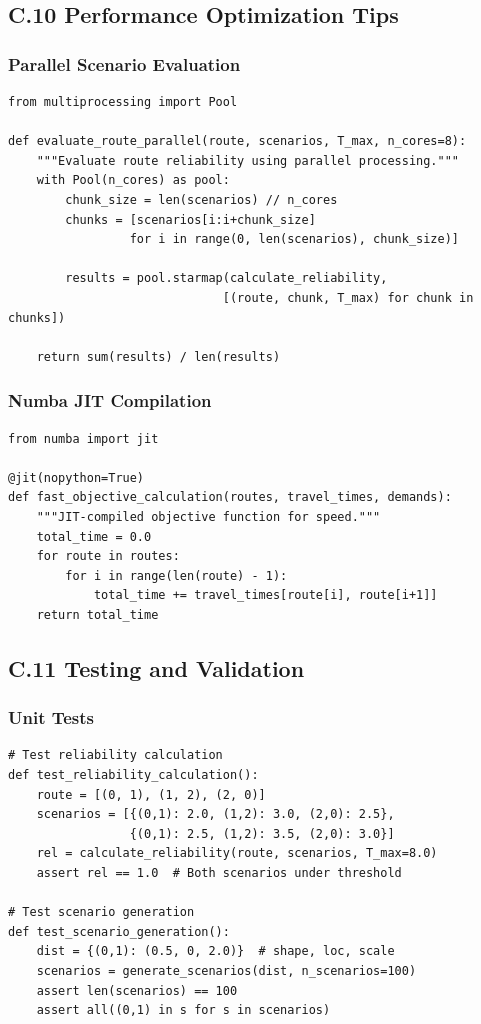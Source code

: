 \subsection{C.10 Performance Optimization Tips}

\subsubsection{Parallel Scenario Evaluation}

\begin{verbatim}
from multiprocessing import Pool

def evaluate_route_parallel(route, scenarios, T_max, n_cores=8):
    """Evaluate route reliability using parallel processing."""
    with Pool(n_cores) as pool:
        chunk_size = len(scenarios) // n_cores
        chunks = [scenarios[i:i+chunk_size]
                 for i in range(0, len(scenarios), chunk_size)]

        results = pool.starmap(calculate_reliability,
                              [(route, chunk, T_max) for chunk in chunks])

    return sum(results) / len(results)
\end{verbatim}

\subsubsection{Numba JIT Compilation}

\begin{verbatim}
from numba import jit

@jit(nopython=True)
def fast_objective_calculation(routes, travel_times, demands):
    """JIT-compiled objective function for speed."""
    total_time = 0.0
    for route in routes:
        for i in range(len(route) - 1):
            total_time += travel_times[route[i], route[i+1]]
    return total_time
\end{verbatim}

\subsection{C.11 Testing and Validation}

\subsubsection{Unit Tests}

\begin{verbatim}
# Test reliability calculation
def test_reliability_calculation():
    route = [(0, 1), (1, 2), (2, 0)]
    scenarios = [{(0,1): 2.0, (1,2): 3.0, (2,0): 2.5},
                 {(0,1): 2.5, (1,2): 3.5, (2,0): 3.0}]
    rel = calculate_reliability(route, scenarios, T_max=8.0)
    assert rel == 1.0  # Both scenarios under threshold

# Test scenario generation
def test_scenario_generation():
    dist = {(0,1): (0.5, 0, 2.0)}  # shape, loc, scale
    scenarios = generate_scenarios(dist, n_scenarios=100)
    assert len(scenarios) == 100
    assert all((0,1) in s for s in scenarios)
\end{verbatim}

